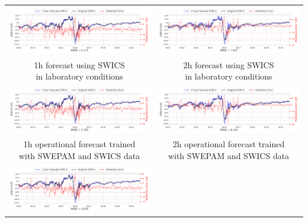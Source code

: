 \documentclass[draft,sw]{agutexSI2019}
\begin{document}
\begin{table}
\centering
\begin{tabular}{cc}
\includegraphics[width=0.49\linewidth]{paper_plots_shade/1h_swics/1h_swics_storm_26.png}
&
\includegraphics[width=0.49\linewidth]{paper_plots_shade/2h_swics/2h_swics_storm_26.png}
\\
\shortstack{1h forecast using SWICS\\ in laboratory conditions} & \shortstack{2h forecast using SWICS\\ in laboratory conditions}
\vspace*{12pt}
\\
\includegraphics[width=0.49\linewidth]{paper_plots_shade/1h_swics_rt/1h_swics_rt_storm_26.png}
&
\includegraphics[width=0.49\linewidth]{paper_plots_shade/2h_swics_rt/2h_swics_rt_storm_26.png}
\\
\shortstack{1h operational forecast trained\\ with SWEPAM and SWICS data} & \shortstack{2h operational forecast trained\\ with SWEPAM and SWICS data}
\vspace*{12pt}
\\
\includegraphics[width=0.49\linewidth]{paper_plots_shade/1h_swepam_rt/1h_swepam_rt_storm_26.png}

\end{tabular}
\end{table}
\end{document}
